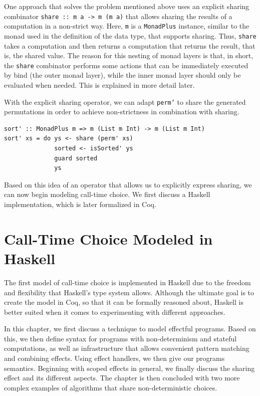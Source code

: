 \documentclass[a4paper, 11pt, fleqn, twoside, abstract=on]{scrreprt}
\newcommand{\hinl}[1]{\texttt{#1}}
\begin{document}
One approach that solves the problem mentioned above uses an explicit sharing combinator \hinl{share :: m a -> m (m a)} that allows sharing the results of a computation in a non-strict way.
Here, \hinl{m} is a \hinl{MonadPlus} instance, similar to the monad used in the definition of the data type, that supports sharing.
Thus, \hinl{share} takes a  computation and then returns a computation that returns the result, that is, the shared value.
The reason for this nesting of monad layers is that, in short, the \hinl{share} combinator performs some actions that can be immediately executed by bind (the outer monad layer), while the inner monad layer should only be evaluated when needed.
This is explained in more detail later.

With the explicit sharing operator, we can adapt \hinl{perm'} to share the generated permutations in order to achieve non-strictness in combination with sharing.

\begin{verbatim}
sort' :: MonadPlus m => m (List m Int) -> m (List m Int)
sort' xs = do ys <- share (perm' xs)
              sorted <- isSorted' ys
              guard sorted
              ys
\end{verbatim}

Based on this idea of an operator that allows us to explicitly express sharing, we can now begin modeling call-time choice.
We first discuss a Haskell implementation, which is later formalized in Coq.

\chapter{Call-Time Choice Modeled in Haskell}
\label{ch:callTimeChoiceHaskell}
The first model of call-time choice is implemented in Haskell due to the freedom and flexibility that Haskell's type system allows.
Although the ultimate goal is to create the model in Coq, so that it can be formally reasoned about, Haskell is better suited when it comes to experimenting with different approaches.

In this chapter, we first discuss a technique to model effectful programs.
Based on this, we then define syntax for programs with non-determinism and stateful computations, as well as infrastructure that allows convenient pattern matching and combining effects.
Using effect handlers, we then give our programs semantics.
Beginning with scoped effects in general, we finally discuss the sharing effect and its different aspects.
The chapter is then concluded with two more complex examples of algorithms that share non-deterministic choices.
\end{document}
